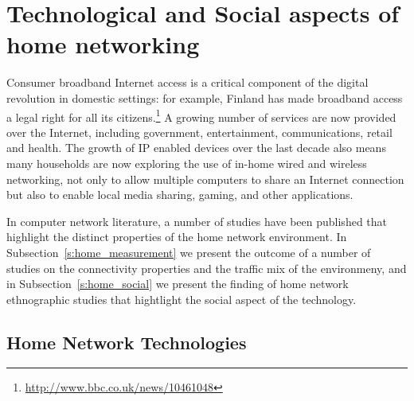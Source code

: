 

\section{Technological and Social aspects of home networking} \label{sec:elephant}

Consumer broadband Internet access is a critical component of the digital
revolution in domestic settings: for example, Finland has made broadband access
a legal right for all its
citizens.\footnote{\url{http://www.bbc.co.uk/news/10461048}} A growing
number of
services are now provided over the Internet, including government,
entertainment, communications, retail and health.  The growth of IP enabled
devices over the last decade also means many households are now exploring the
use of in-home wired and wireless networking, not only to allow multiple
computers to share an Internet connection but also to enable local media
sharing, gaming, and other applications.  



In computer network literature, a number of studies have been published that
highlight the distinct properties of the home network environment. In 
Subsection~\ref{s:home_measurement} we present the outcome of a number of
studies on the connectivity properties and the traffic mix of the
environmeny, and in Subsection~\ref{s:home_social} we present the finding of
home network ethnographic studies that hightlight the social aspect of the
technology.

\subsection{Home Network Technologies}

